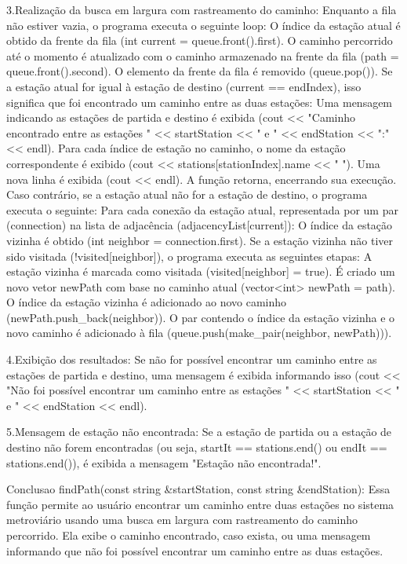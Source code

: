 3.Realização da busca em largura com rastreamento do caminho:
Enquanto a fila não estiver vazia, o programa executa o seguinte loop:
O índice da estação atual é obtido da frente da fila (int current = queue.front().first).
O caminho percorrido até o momento é atualizado com o caminho armazenado na frente da fila (path = queue.front().second).
O elemento da frente da fila é removido (queue.pop()).
Se a estação atual for igual à estação de destino (current == endIndex), isso significa que foi encontrado um caminho entre as duas estações:
Uma mensagem indicando as estações de partida e destino é exibida (cout << "Caminho encontrado entre as estações " << startStation << " e " << endStation << ":" << endl).
Para cada índice de estação no caminho, o nome da estação correspondente é exibido (cout << stations[stationIndex].name << " ").
Uma nova linha é exibida (cout << endl).
A função retorna, encerrando sua execução.
Caso contrário, se a estação atual não for a estação de destino, o programa executa o seguinte:
Para cada conexão da estação atual, representada por um par (connection) na lista de adjacência (adjacencyList[current]):
O índice da estação vizinha é obtido (int neighbor = connection.first).
Se a estação vizinha não tiver sido visitada (!visited[neighbor]), o programa executa as seguintes etapas:
A estação vizinha é marcada como visitada (visited[neighbor] = true).
É criado um novo vetor newPath com base no caminho atual (vector<int> newPath = path).
O índice da estação vizinha é adicionado ao novo caminho (newPath.push_back(neighbor)).
O par contendo o índice da estação vizinha e o novo caminho é adicionado à fila (queue.push(make_pair(neighbor, newPath))).

4.Exibição dos resultados:
Se não for possível encontrar um caminho entre as estações de partida e destino, uma mensagem é exibida informando isso (cout << "Não foi possível encontrar um caminho entre as estações " << startStation << " e " << endStation << endl).

5.Mensagem de estação não encontrada:
Se a estação de partida ou a estação de destino não forem encontradas (ou seja, startIt == stations.end() ou endIt == stations.end()), é exibida a mensagem "Estação não encontrada!".

Conclusao findPath(const string &startStation, const string &endStation):
Essa função permite ao usuário encontrar um caminho entre duas estações no sistema metroviário usando uma busca em largura com rastreamento do caminho percorrido. 
Ela exibe o caminho encontrado, caso exista, ou uma mensagem informando que não foi possível encontrar um caminho entre as duas estações.

